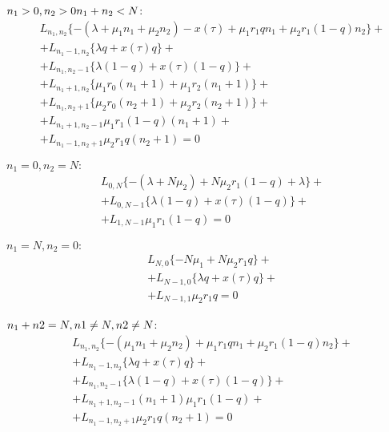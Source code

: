 $n_{1}>0, n_{2}>0\\
n_{1}+n_{2}< N$:\\
\begin{equation}\label{rEquationLong3}
	\begin{split}
		&L_{n_{1}, n_{2}}\{-(\lambda+\mu_{1}n_{1}+\mu_{2}n_{2}) - x(\tau)+ \mu_{1}r_{1}qn_{1}+ \mu_{2}r_{1}(1-q)n_{2}\}+\\
		&+L_{n_{1}-1, n_{2}}\{\lambda q+ x(\tau) q  \}+\\
		&+L_{n_{1}, n_{2}-1}\{\lambda (1-q) + x(\tau) (1-q) \}+\\
		&+L_{n_{1} +1 , n_{2}}\{ \mu_{1} r_{0}(n_{1}+1) + \mu_{1} r_{2} (n_{1}+1)\}+\\
		&+L_{n_{1}, n_{2} + 1 }\{ \mu_{2} r_{0}(n_{2}+1)  + \mu_{2} r_{2} (n_{2}+1) \}+\\
		&+L_{n_{1} +1 , n_{2}-1}\mu_{1} r_{1}(1-q)(n_{1}+1) +\\
		&+ L_{n_{1} -1 , n_{2}+1}\mu_{2} r_{1}q(n_{2}+1)=0
	\end{split}
\end{equation}

$n_{1}=0, n_{2}=N:$\\
\begin{equation}\label{rEquationLong4}
	\begin{split}
		&L_{0, N}\{-(\lambda+N\mu_{2}) + N\mu_{2}r_{1}(1-q)+ \lambda \}+\\
		&+L_{0, N-1}\{\lambda (1-q) + x(\tau) (1-q) \}+\\
		&+L_{1 ,N-1}\mu_{1} r_{1}(1-q) =0
	\end{split}
\end{equation}

$n_{1}=N, n_{2}=0:$\\
\begin{equation}\label{rEquationLong5}
	\begin{split}
		&L_{N, 0}\{-N\mu_{1}+ N\mu_{2}r_{1}q\}+\\
		&+L_{N-1, 0}\{\lambda q+ x(\tau) q  \}+\\
		&+L_{N -1 , 1}\mu_{2} r_{1}q =0
	\end{split}
\end{equation}

$n_{1}+n{2}=N,\\
n{1}\neq N, n{2}\neq N$:\\
\begin{equation}\label{rEquationLong6}
	\begin{split}
		&L_{n_{1}, n_{2}}\{-(\mu_{1}n_{1}+\mu_{2}n_{2}) + \mu_{1}r_{1}qn_{1}+ \mu_{2}r_{1}(1-q)n_{2}\}+\\
		&+L_{n_{1}-1, n_{2}}\{\lambda q+ x(\tau) q  \}+\\
		&+L_{n_{1}, n_{2}-1}\{\lambda (1-q) +	 x(\tau) (1-q) \}+\\
		&+L_{n_{1} +1 , n_{2}-1}(n_{1}+1)\mu_{1} r_{1}(1-q) +\\
		&+L_{n_{1} -1 , n_{2}+1}\mu_{2} r_{1}q(n_{2}+1) =0
	\end{split}
\end{equation}

